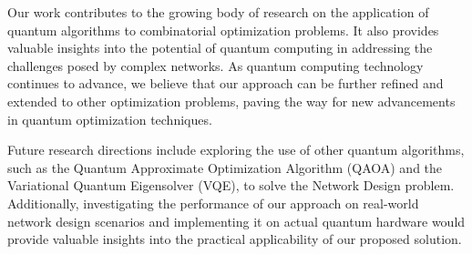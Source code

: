 Our work contributes to the growing body of research on the application of quantum algorithms to combinatorial optimization problems. It also provides valuable insights into the potential of quantum computing in addressing the challenges posed by complex networks. As quantum computing technology continues to advance, we believe that our approach can be further refined and extended to other optimization problems, paving the way for new advancements in quantum optimization techniques.

Future research directions include exploring the use of other quantum algorithms, such as the Quantum Approximate Optimization Algorithm (QAOA) and the Variational Quantum Eigensolver (VQE), to solve the Network Design problem. Additionally, investigating the performance of our approach on real-world network design scenarios and implementing it on actual quantum hardware would provide valuable insights into the practical applicability of our proposed solution.

